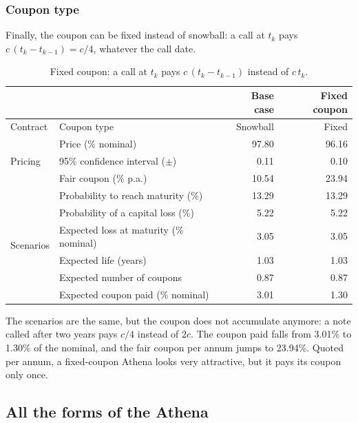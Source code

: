 \documentclass[11pt,a4paper]{article}
\begin{document}
\clearpage
\subsubsection{Coupon type}

Finally, the coupon can be fixed instead of snowball: a call at $t_k$ pays $c\,(t_k - t_{k-1}) = c/4$, whatever the
call date.

\begin{table}[htbp]
  \centering
  \small
  \begin{tabular}{llrr}
    \toprule
     & & \textbf{Base case} & \textbf{Fixed coupon} \\
    \midrule
    \multirow{1}{*}{Contract}
      & Coupon type & Snowball & Fixed \\
    \midrule
    \multirow{3}{*}{Pricing}
      & Price (\% nominal) & 97.80 & 96.16 \\
      & 95\% confidence interval ($\pm$) & 0.11 & 0.10 \\
      & Fair coupon (\% p.a.) & 10.54 & 23.94 \\
    \midrule
    \multirow{6}{*}{Scenarios}
      & Probability to reach maturity (\%) & 13.29 & 13.29 \\
      & Probability of a capital loss (\%) & 5.22 & 5.22 \\
      & Expected loss at maturity (\% nominal) & 3.05 & 3.05 \\
      & Expected life (years) & 1.03 & 1.03 \\
      & Expected number of coupons & 0.87 & 0.87 \\
      & Expected coupon paid (\% nominal) & 3.01 & 1.30 \\
    \bottomrule
  \end{tabular}
  \caption{Fixed coupon: a call at $t_k$ pays $c\,(t_k - t_{k-1})$ instead of $c\,t_k$.}
  \label{tab:athena-fixed}
\end{table}

The scenarios are the same, but the coupon does not accumulate anymore: a note called after two years pays $c/4$
instead of $2c$. The coupon paid falls from 3.01\% to 1.30\% of the nominal, and the fair coupon per annum jumps to
23.94\%. Quoted per annum, a fixed-coupon Athena looks very attractive, but it pays its coupon only once.

\clearpage
\subsection{All the forms of the Athena}
\end{document}
